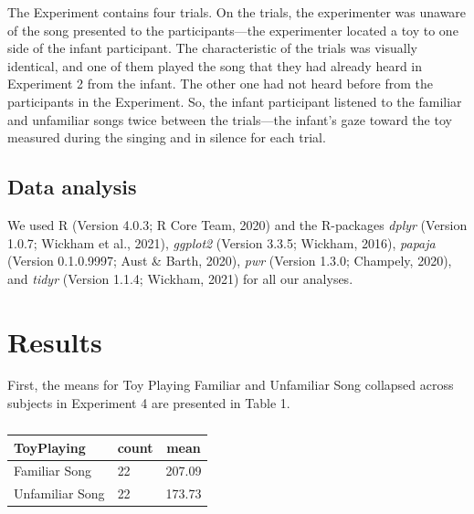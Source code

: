 \documentclass[
  english,
  man]{apa6}
\begin{document}
The Experiment contains four trials. On the trials, the experimenter was unaware of the song presented to the participants---the experimenter located a toy to one side of the infant participant. The characteristic of the trials was visually identical, and one of them played the song that they had already heard in Experiment 2 from the infant. The other one had not heard before from the participants in the Experiment. So, the infant participant listened to the familiar and unfamiliar songs twice between the trials---the infant's gaze toward the toy measured during the singing and in silence for each trial.

\hypertarget{data-analysis}{%
\subsection{Data analysis}\label{data-analysis}}

We used R (Version 4.0.3; R Core Team, 2020) and the R-packages \emph{dplyr} (Version 1.0.7; Wickham et al., 2021), \emph{ggplot2} (Version 3.3.5; Wickham, 2016), \emph{papaja} (Version 0.1.0.9997; Aust \& Barth, 2020), \emph{pwr} (Version 1.3.0; Champely, 2020), and \emph{tidyr} (Version 1.1.4; Wickham, 2021) for all our analyses.

\hypertarget{results}{%
\section{Results}\label{results}}

First, the means for Toy Playing Familiar and Unfamiliar Song collapsed across subjects in Experiment 4 are presented in Table 1.

\begin{table}[tbp]

\begin{center}
\begin{threeparttable}

\caption{\label{tab:unnamed-chunk-1}}

\begin{tabular}{lll}
\toprule
ToyPlaying & \multicolumn{1}{c}{count} & \multicolumn{1}{c}{mean}\\
\midrule
Familiar Song & 22 & 207.09\\
Unfamiliar Song & 22 & 173.73\\
\bottomrule
\end{tabular}

\end{threeparttable}
\end{center}

\end{table}
\end{document}
